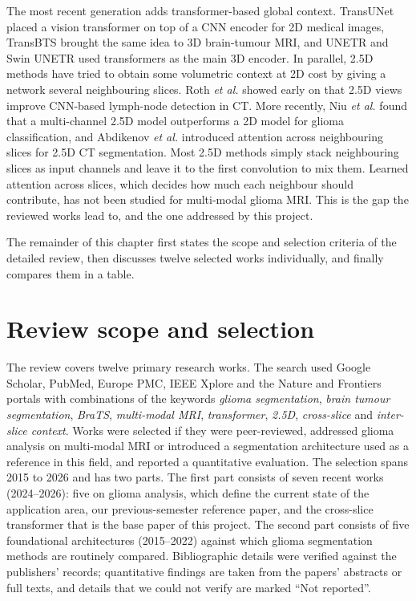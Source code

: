 The most recent generation adds transformer-based global context. TransUNet \cite{chen2021transunet} placed a vision transformer on top of a CNN encoder for 2D medical images, TransBTS \cite{wang2021transbts} brought the same idea to 3D brain-tumour MRI, and UNETR \cite{hatamizadeh2022unetr} and Swin UNETR \cite{hatamizadeh2022swin} used transformers as the main 3D encoder. In parallel, 2.5D methods have tried to obtain some volumetric context at 2D cost by giving a network several neighbouring slices. Roth \emph{et al.} \cite{roth2014} showed early on that 2.5D views improve CNN-based lymph-node detection in CT. More recently, Niu \emph{et al.} \cite{niu2025} found that a multi-channel 2.5D model outperforms a 2D model for glioma classification, and Abdikenov \emph{et al.} \cite{abdikenov2026} introduced attention across neighbouring slices for 2.5D CT segmentation. Most 2.5D methods simply stack neighbouring slices as input channels and leave it to the first convolution to mix them. Learned attention across slices, which decides how much each neighbour should contribute, has not been studied for multi-modal glioma MRI. This is the gap the reviewed works lead to, and the one addressed by this project.

The remainder of this chapter first states the scope and selection criteria of the detailed review, then discusses twelve selected works individually, and finally compares them in a table.

\section{Review scope and selection}
The review covers twelve primary research works. The search used Google Scholar, PubMed, Europe PMC, IEEE Xplore and the Nature and Frontiers portals with combinations of the keywords \emph{glioma segmentation}, \emph{brain tumour segmentation}, \emph{BraTS}, \emph{multi-modal MRI}, \emph{transformer}, \emph{2.5D}, \emph{cross-slice} and \emph{inter-slice context}. Works were selected if they were peer-reviewed, addressed glioma analysis on multi-modal MRI or introduced a segmentation architecture used as a reference in this field, and reported a quantitative evaluation. The selection spans 2015 to 2026 and has two parts. The first part consists of seven recent works (2024--2026): five on glioma analysis, which define the current state of the application area, our previous-semester reference paper, and the cross-slice transformer that is the base paper of this project. The second part consists of five foundational architectures (2015--2022) against which glioma segmentation methods are routinely compared. Bibliographic details were verified against the publishers' records; quantitative findings are taken from the papers' abstracts or full texts, and details that we could not verify are marked ``Not reported''.

